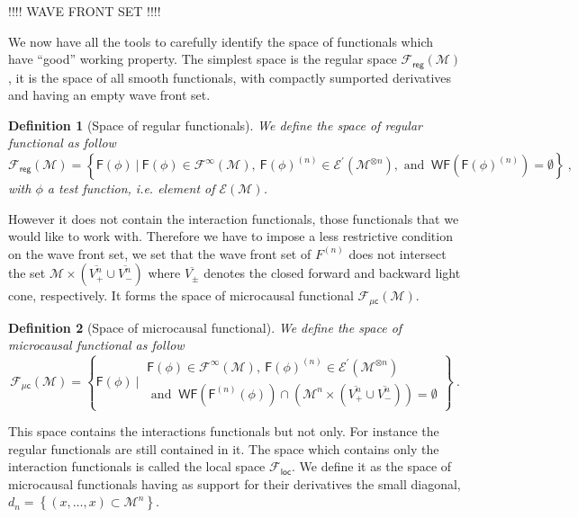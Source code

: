 \documentclass[10pt]{book}
\newcommand{\WF}{\mathsf{WF}}
\newcommand{\Ecal}{\mathcal{E}}
\newcommand{\Fcal}{\mathcal{F}}
\newcommand{\Mcal}{\mathcal{M}}
\newcommand{\Fsf}{\mathsf{F}}
\newcommand{\csf}{\mathsf{c}}
\theoremstyle{break}
\newtheorem{definition}{Definition}
\begin{document}
\bigskip


\begin{center}
!!!! WAVE FRONT SET !!!!
\end{center}



\bigskip


We now have all the tools to carefully identify the space of functionals which have ``good'' working property. %
The simplest space is the regular space $\mathcal{F}_\mathsf{reg}(\Mcal)$, it is the space of all smooth functionals, with compactly sumported derivatives and having an empty wave front set. %
%
\begin{definition}[Space of regular functionals]
We define the space of regular functional as follow
%
\begin{equation*}
\Fcal_{\mathsf{reg}}(\Mcal) = \left\{ \Fsf(\phi) \ \bigg| \ \Fsf(\phi) \in \Fcal^\infty(\Mcal), \ \Fsf(\phi)^{(n)} \in \Ecal^\prime(\Mcal^{\otimes n}), \mbox{ and } \ \WF(\Fsf(\phi)^{(n)}) = \emptyset \right\} \ ,
\end{equation*}
%
with $\phi$ a test function, i.e. element of $\Ecal(\Mcal)$. 
\end{definition}
%
However it does not contain the interaction functionals, those functionals that we would like to work with. Therefore we have to impose a less restrictive condition on the wave front set, we set that the wave front set of $F^{(n)}$ does not intersect the set $\mathcal{M} \times (\overline{V^n_+} \cup \overline{V^n_-})$ where $\overline{V_\pm}$ denotes the closed forward and backward light cone, respectively. It forms the space of microcausal functional $\mathcal{F}_\mathsf{\mu c}(\Mcal)$.%
%
\begin{definition}[Space of microcausal functional]
We define the space of microcausal functional as follow
%
\begin{equation*}
\Fcal_{\mu\csf}(\Mcal) = \left\{ 
\Fsf(\phi) \ \bigg| \ 
\begin{array}{l}
\Fsf(\phi) \in \Fcal^\infty(\Mcal), \ \Fsf(\phi)^{(n)} \in \Ecal^\prime(\Mcal^{\otimes n}) \\
\mbox{ and } \ \WF(\Fsf^{(n)}(\phi)) \cap \left( \Mcal^n \times ( \overline{V^{n}_{+}} \cup \overline{V^{n}_{-}} ) \right)  = \emptyset 
\end{array}
\right\} \ .
\end{equation*}
%
\end{definition}
%
This space contains the interactions functionals but not only. For instance the regular functionals are still contained in it. The space which contains only the interaction functionals is called the local space $\mathcal{F}_\mathsf{loc}$. We define it as the space of microcausal functionals having as support for their derivatives the small diagonal, $d_n = \left\{ (x,\dots,x) \subset \Mcal^n \right\}$.%
\end{document}
